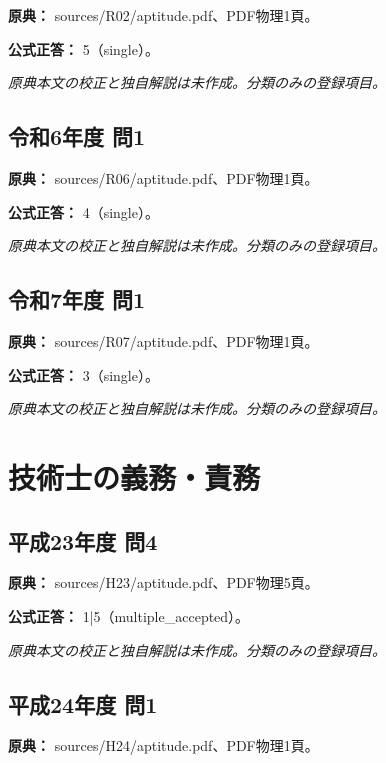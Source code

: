 \noindent\textbf{原典：} sources/R02/aptitude.pdf、PDF物理1頁。

\textbf{公式正答：} 5（single）。

\par\textit{原典本文の校正と独自解説は未作成。分類のみの登録項目。}

\subsection{令和6年度 問1}
\label{q:r06-reg-apt-01}

\noindent\textbf{原典：} sources/R06/aptitude.pdf、PDF物理1頁。

\textbf{公式正答：} 4（single）。

\par\textit{原典本文の校正と独自解説は未作成。分類のみの登録項目。}

\subsection{令和7年度 問1}
\label{q:r07-reg-apt-01}

\noindent\textbf{原典：} sources/R07/aptitude.pdf、PDF物理1頁。

\textbf{公式正答：} 3（single）。

\par\textit{原典本文の校正と独自解説は未作成。分類のみの登録項目。}

\section{技術士の義務・責務}

\subsection{平成23年度 問4}
\label{q:h23-reg-apt-04}

\noindent\textbf{原典：} sources/H23/aptitude.pdf、PDF物理5頁。

\textbf{公式正答：} 1|5（multiple\_accepted）。

\par\textit{原典本文の校正と独自解説は未作成。分類のみの登録項目。}

\subsection{平成24年度 問1}
\label{q:h24-reg-apt-01}

\noindent\textbf{原典：} sources/H24/aptitude.pdf、PDF物理1頁。

